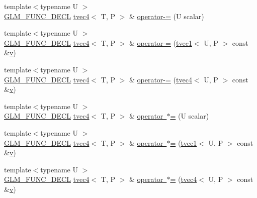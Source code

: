 \begin{DoxyCompactItemize}
\item 
{\footnotesize template$<$typename U $>$ }\\\mbox{\hyperlink{setup_8hpp_ab2d052de21a70539923e9bcbf6e83a51}{G\+L\+M\+\_\+\+F\+U\+N\+C\+\_\+\+D\+E\+CL}} \mbox{\hyperlink{structglm_1_1tvec4}{tvec4}}$<$ T, P $>$ \& \mbox{\hyperlink{structglm_1_1tvec4_af782f3e86c5590d64f950a389329a39a}{operator-\/=}} (U scalar)
\item 
{\footnotesize template$<$typename U $>$ }\\\mbox{\hyperlink{setup_8hpp_ab2d052de21a70539923e9bcbf6e83a51}{G\+L\+M\+\_\+\+F\+U\+N\+C\+\_\+\+D\+E\+CL}} \mbox{\hyperlink{structglm_1_1tvec4}{tvec4}}$<$ T, P $>$ \& \mbox{\hyperlink{structglm_1_1tvec4_ac24de9d6acf744c2096912edc4df028b}{operator-\/=}} (\mbox{\hyperlink{structglm_1_1tvec1}{tvec1}}$<$ U, P $>$ const \&\mbox{\hyperlink{glad_8h_a14cfbe2fc2234f5504618905b69d1e06}{v}})
\item 
{\footnotesize template$<$typename U $>$ }\\\mbox{\hyperlink{setup_8hpp_ab2d052de21a70539923e9bcbf6e83a51}{G\+L\+M\+\_\+\+F\+U\+N\+C\+\_\+\+D\+E\+CL}} \mbox{\hyperlink{structglm_1_1tvec4}{tvec4}}$<$ T, P $>$ \& \mbox{\hyperlink{structglm_1_1tvec4_afe14eb392701467a495123d8163827eb}{operator-\/=}} (\mbox{\hyperlink{structglm_1_1tvec4}{tvec4}}$<$ U, P $>$ const \&\mbox{\hyperlink{glad_8h_a14cfbe2fc2234f5504618905b69d1e06}{v}})
\item 
{\footnotesize template$<$typename U $>$ }\\\mbox{\hyperlink{setup_8hpp_ab2d052de21a70539923e9bcbf6e83a51}{G\+L\+M\+\_\+\+F\+U\+N\+C\+\_\+\+D\+E\+CL}} \mbox{\hyperlink{structglm_1_1tvec4}{tvec4}}$<$ T, P $>$ \& \mbox{\hyperlink{structglm_1_1tvec4_a85d2234fa175637ec1073d7a2b5a7fd8}{operator $\ast$=}} (U scalar)
\item 
{\footnotesize template$<$typename U $>$ }\\\mbox{\hyperlink{setup_8hpp_ab2d052de21a70539923e9bcbf6e83a51}{G\+L\+M\+\_\+\+F\+U\+N\+C\+\_\+\+D\+E\+CL}} \mbox{\hyperlink{structglm_1_1tvec4}{tvec4}}$<$ T, P $>$ \& \mbox{\hyperlink{structglm_1_1tvec4_acbebe5a2be0501c3e69dffc6b851d5d6}{operator $\ast$=}} (\mbox{\hyperlink{structglm_1_1tvec1}{tvec1}}$<$ U, P $>$ const \&\mbox{\hyperlink{glad_8h_a14cfbe2fc2234f5504618905b69d1e06}{v}})
\item 
{\footnotesize template$<$typename U $>$ }\\\mbox{\hyperlink{setup_8hpp_ab2d052de21a70539923e9bcbf6e83a51}{G\+L\+M\+\_\+\+F\+U\+N\+C\+\_\+\+D\+E\+CL}} \mbox{\hyperlink{structglm_1_1tvec4}{tvec4}}$<$ T, P $>$ \& \mbox{\hyperlink{structglm_1_1tvec4_a5977f8c180362ba0b96b61f4197ea98a}{operator $\ast$=}} (\mbox{\hyperlink{structglm_1_1tvec4}{tvec4}}$<$ U, P $>$ const \&\mbox{\hyperlink{glad_8h_a14cfbe2fc2234f5504618905b69d1e06}{v}})

\end{DoxyCompactItemize}
